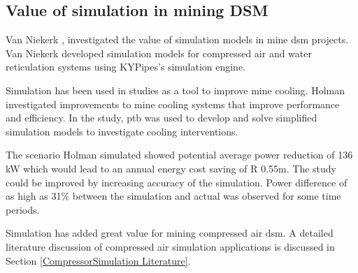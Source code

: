 	\subsection{Value of simulation in mining DSM}
	Van Niekerk \cite{van2013value}, \cite{vanNiekerk2012Value} investigated the value of simulation models in mine \gls{dsm} projects. Van Niekerk developed simulation models for compressed air and water reticulation systems using KYPipes's simulation engine. 
	\par
	Simulation has been used in studies as a tool to improve mine cooling. Holman \cite{Holman2014Masters} investigated improvements to mine cooling systems that improve performance and efficiency. In the study, \gls{ptb} was used to develop and solve simplified simulation models to investigate cooling interventions.
	\par 
	The scenario Holman simulated showed potential average power reduction of 136 kW which would lead to an annual energy cost saving of R 0.55m. The study could be improved by increasing accuracy of the simulation. Power difference of as high as 31\% between the simulation and actual was observed for some time periods.
	\par
	Simulation has added great value for mining compressed air \gls{dsm}. A detailed literature discussion of compressed air simulation applications is discussed in Section \ref{CompressorSimulation Literature}.
